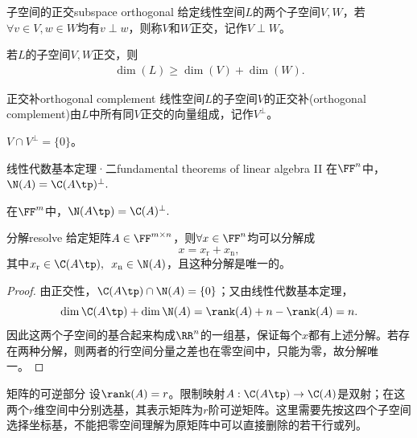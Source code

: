 \begin{definition}{子空间的正交}{subspace orthogonal}
	给定线性空间$L$的两个子空间$V,W$，若$\forall v\in V,w\in W$均有$v\perp w$，则称$V$和$W$正交，记作$V\perp W$。
\end{definition}
\begin{corollary}
	若$L$的子空间$V,W$正交，则
	\begin{align}
		\dim(L)\geqslant\dim(V)+\dim(W).
	\end{align}
\end{corollary}
\begin{definition}{正交补}{orthogonal complement}
	线性空间$L$的子空间$V$的正交补(orthogonal complement)由$L$中所有同$V$正交的向量组成，记作$V^\perp$。
\end{definition}
\begin{corollary}
	$V\cap V^\perp=\{0\}$。
\end{corollary}
\begin{theorem}{线性代数基本定理·二}{fundamental theorems of linear algebra II}
	在$\FF^n$中，$\N(A)=\C(A\tp)^\perp.$

	在$\FF^m$中，$\N(A\tp)=\C(A)^\perp.$
\end{theorem}
\begin{theorem}{分解}{resolve}
给定矩阵$A\in\FF^{m\times n}$，则$\forall x\in\FF^n$均可以分解成
\[
	x=x_\mathrm r+x_\mathrm n,
\]
其中$x_\mathrm r\in\C(A\tp),\enspace x_\mathrm n\in\N(A)$，且这种分解是唯一的。
\end{theorem}
\begin{proof}
	由正交性，$\C(A\tp)\cap\N(A)=\{0\}$；又由线性代数基本定理，
	\[
		\dim\C(A\tp)+\dim\N(A)=\rank(A)+n-\rank(A)=n.
	\]
	因此这两个子空间的基合起来构成$\RR^n$的一组基，保证每个$x$都有上述分解。若存在两种分解，则两者的行空间分量之差也在零空间中，只能为零，故分解唯一。
\end{proof}
\begin{theorem}
	{矩阵的可逆部分}{}
	设$\rank(A)=r$。限制映射$A:\C(A\tp)\to\C(A)$是双射；在这两个$r$维空间中分别选基，其表示矩阵为$r$阶可逆矩阵。这里需要先按这四个子空间选择坐标基，不能把零空间理解为原矩阵中可以直接删除的若干行或列。
\end{theorem}
